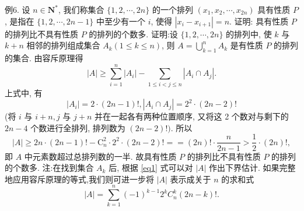 例6. 设 $n \in \mathbf{N}^*$, 我们称集合 $\{1,2, \cdots, 2 n\}$ 的一个排列 $\left(x_1, x_2, \cdots, x_{2 n}\right)$ 具有性质 $P$, 是指在 $\{1,2, \cdots, 2 n-1\}$ 中至少有一个 $i$, 使得 $\left|x_i-x_{i+1}\right|=n$. 证明: 具有性质 $P$ 的排列比不具有性质 $P$ 的排列的个数多.
证明:设 $\{1,2, \cdots, 2 n\}$ 的排列中, 使 $k$ 与 $k+n$ 相邻的排列组成集合 $A_k (1 \leqslant k \leqslant n)$, 则 $A=\bigcup_{k=1}^n A_k$ 是有性质 $P$ 的排列的集合.
由容斥原理得
$$
|A| \geqslant \sum_{i=1}^n\left|A_i\right|-\sum_{1 \leqslant i<j \leqslant n}\left|A_i \cap A_j\right| .\label{eq1}
$$
上式中, 有
$$
\left|A_i\right|=2 \cdot(2 n-1) !,\left|A_i \cap A_j\right|=2^2 \cdot(2 n-2) !
$$
(将 $i$ 与 $i+n, j$ 与 $j+n$ 并在一起各有两种位置顺序, 又将这 2 个数对与剩下的 $2 n-4$ 个数进行全排列, 排列数为 $(2 n-2) !)$. 所以
$$
|A| \geqslant 2 n \cdot(2 n-1) !-\mathrm{C}_n^2 \cdot 2^2 \cdot(2 n-2) !==(2 n) ! \cdot \frac{n}{2 n-1}>\frac{1}{2} \cdot(2 n) !,
$$
即 $A$ 中元素数超过总排列数的一半.
故具有性质 $P$ 的排列比不具有性质 $P$ 的排列的个数多.
注:在找到集合 $A_k$ 后, 根据 \ref{eq1} 式可以对 $|A|$ 作出下界估计.
如果完整地应用容斥原理的等式,我们则可进一步将 $|A|$ 表示成关于 $n$ 的求和式
$$
|A|=\sum_{k=1}^n(-1)^{k-1} 2^k C_n^k(2 n-k) ! .
$$



